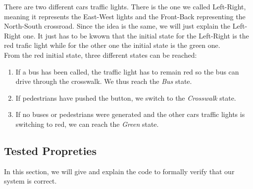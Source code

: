 There are two different cars traffic lights. There is the one we called Left-Right, meaning it represents the East-West lights and the Front-Back representing the North-South crossroad. Since the idea is the same, we will just explain the Left-Right one. It just has to be kwown that the initial state for the Left-Right is the red trafic light while for the other one the initial state is the green one. \\

From the red initial state, three different states can be reached:
\begin{enumerate}
  \item If a bus has been called, the traffic light has to remain red so the bus can drive through the crosswalk. We thus reach the \textit{Bus} state.
  \item If pedestrians have pushed the button, we switch to the \textit{Crosswalk} state.
  \item If no buses or pedestrians were generated and the other cars traffic lights is switching to red, we can reach the \textit{Green} state.
\end{enumerate}

\subsection{Tested Propreties}
In this section, we will give and explain the code to formally verify that our system is correct.

